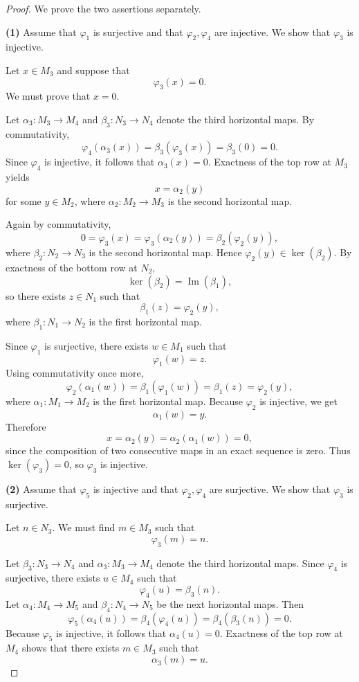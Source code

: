 \begin{proof}
    We prove the two assertions separately.

    \medskip

    \noindent\textbf{(1)} Assume that $\varphi_1$ is surjective and that $\varphi_2,\varphi_4$ are injective. We show that $\varphi_3$ is injective.

    Let $x\in M_3$ and suppose that
    \[
        \varphi_3(x)=0.
    \]
    We must prove that $x=0$.

    Let $\alpha_3:M_3\to M_4$ and $\beta_3:N_3\to N_4$ denote the third horizontal maps. By commutativity,
    \[
        \varphi_4(\alpha_3(x))=\beta_3(\varphi_3(x))=\beta_3(0)=0.
    \]
    Since $\varphi_4$ is injective, it follows that $\alpha_3(x)=0$. Exactness of the top row at $M_3$ yields
    \[
        x=\alpha_2(y)
    \]
    for some $y\in M_2$, where $\alpha_2:M_2\to M_3$ is the second horizontal map.

    Again by commutativity,
    \[
        0=\varphi_3(x)=\varphi_3(\alpha_2(y))=\beta_2(\varphi_2(y)),
    \]
    where $\beta_2:N_2\to N_3$ is the second horizontal map. Hence $\varphi_2(y)\in\ker(\beta_2)$. By exactness of the bottom row at $N_2$,
    \[
        \ker(\beta_2)=\operatorname{Im}(\beta_1),
    \]
    so there exists $z\in N_1$ such that
    \[
        \beta_1(z)=\varphi_2(y),
    \]
    where $\beta_1:N_1\to N_2$ is the first horizontal map.

    Since $\varphi_1$ is surjective, there exists $w\in M_1$ such that
    \[
        \varphi_1(w)=z.
    \]
    Using commutativity once more,
    \[
        \varphi_2(\alpha_1(w))
        =
        \beta_1(\varphi_1(w))
        =
        \beta_1(z)
        =
        \varphi_2(y),
    \]
    where $\alpha_1:M_1\to M_2$ is the first horizontal map. Because $\varphi_2$ is injective, we get
    \[
        \alpha_1(w)=y.
    \]
    Therefore
    \[
        x=\alpha_2(y)=\alpha_2(\alpha_1(w))=0,
    \]
    since the composition of two consecutive maps in an exact sequence is zero. Thus $\ker(\varphi_3)=0$, so $\varphi_3$ is injective.

    \medskip

    \noindent\textbf{(2)} Assume that $\varphi_5$ is injective and that $\varphi_2,\varphi_4$ are surjective. We show that $\varphi_3$ is surjective.

    Let $n\in N_3$. We must find $m\in M_3$ such that
    \[
        \varphi_3(m)=n.
    \]

    Let $\beta_3:N_3\to N_4$ and $\alpha_3:M_3\to M_4$ denote the third horizontal maps. Since $\varphi_4$ is surjective, there exists $u\in M_4$ such that
    \[
        \varphi_4(u)=\beta_3(n).
    \]
    Let $\alpha_4:M_4\to M_5$ and $\beta_4:N_4\to N_5$ be the next horizontal maps. Then
    \[
        \varphi_5(\alpha_4(u))
        =
        \beta_4(\varphi_4(u))
        =
        \beta_4(\beta_3(n))
        =
        0.
    \]
    Because $\varphi_5$ is injective, it follows that $\alpha_4(u)=0$. Exactness of the top row at $M_4$ shows that there exists $m\in M_3$ such that
    \[
        \alpha_3(m)=u.
    \]


\end{proof}
